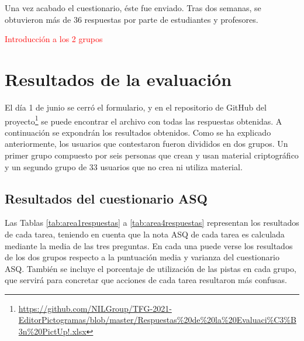 Una vez acabado el cuestionario, éste fue enviado. Tras dos semanas, se obtuvieron más de 36 respuestas por parte de estudiantes y profesores. 

\textcolor{red}{Introducción a los 2 grupos}


\section{Resultados de la evaluación}
\label{eva:res}

El día 1 de junio se cerró el formulario, y en el repositorio de GitHub del proyecto\footnote{\url{https://github.com/NILGroup/TFG-2021-EditorPictogramas/blob/master/Respuestas\%20de\%20la\%20Evaluaci\%C3\%B3n\%20PictUp!.xlsx}} se puede encontrar el archivo con todas las respuestas obtenidas. A continuación se expondrán los resultados obtenidos. Como se ha explicado anteriormente, los usuarios que contestaron fueron divididos en dos grupos. Un primer grupo compuesto por seis personas que crean y usan material criptográfico y un segundo grupo de 33 usuarios que no crea ni utiliza material. 

\subsection{Resultados del cuestionario ASQ}
Las Tablas \ref{tab:area1respuestas} a \ref{tab:area4respuestas} representan los resultados de cada tarea, teniendo en cuenta que la nota ASQ de cada tarea es calculada mediante la media de las tres preguntas. En cada una puede verse los resultados de los dos grupos respecto a la puntuación media y varianza del cuestionario ASQ. También se incluye el porcentaje de utilización de las pistas en cada grupo, que servirá para concretar que acciones de cada tarea resultaron más confusas.


